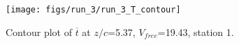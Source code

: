 \begin{figure}[H]
\centering
\texttt{[image: figs/run\_3/run\_3\_T\_contour]}
\caption{Contour plot of $\overline{t}$ at $z/c$=5.37, $V_{free}$=19.43, station 1.}
\label{fig:run_3_T_contour}
\end{figure}


